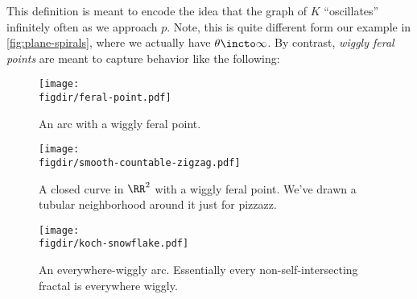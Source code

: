 \begin{remark}
  This definition is meant to encode the idea that the graph of $K$
  ``oscillates'' infinitely often as we approach $p$. Note, this is
  quite different form our example in \cref{fig:plane-spirals}, where
  we actually have $\theta \incto \infty$. By contrast, \emph{wiggly
    feral points} are meant to capture behavior like the following:
  \begin{figure}[H]
    \centering
    \texttt{[image: \\figdir/feral-point.pdf]}
    \caption[Wiggly Arc]{An arc with a wiggly feral point.}
  \end{figure}
  \begin{figure}[H]
    \centering
    \texttt{[image: \\figdir/smooth-countable-zigzag.pdf]}
    \caption[Another Wiggly Arc]{A closed curve in $\RR^2$ with a
      wiggly feral point. We've drawn a tubular neighborhood around it
      just for pizzazz.
    }
  \end{figure}
  \begin{figure}[H]
    \centering
    \texttt{[image: \\figdir/koch-snowflake.pdf]}
    \caption[An Everywhere Wiggly Arc]{An everywhere-wiggly arc.
      Essentially every non-self-intersecting fractal is everywhere
      wiggly.}
    \label{fig:everywhere-wiggly}
  \end{figure}
\end{remark}

